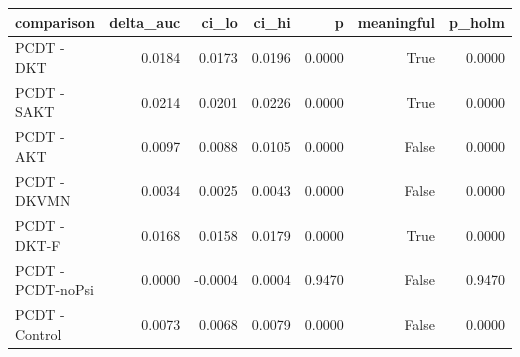 \begin{tabular}{lrrrrrr}
\toprule
comparison & delta\_auc & ci\_lo & ci\_hi & p & meaningful & p\_holm \\
\midrule
PCDT - DKT & 0.0184 & 0.0173 & 0.0196 & 0.0000 & True & 0.0000 \\
PCDT - SAKT & 0.0214 & 0.0201 & 0.0226 & 0.0000 & True & 0.0000 \\
PCDT - AKT & 0.0097 & 0.0088 & 0.0105 & 0.0000 & False & 0.0000 \\
PCDT - DKVMN & 0.0034 & 0.0025 & 0.0043 & 0.0000 & False & 0.0000 \\
PCDT - DKT-F & 0.0168 & 0.0158 & 0.0179 & 0.0000 & True & 0.0000 \\
PCDT - PCDT-noPsi & 0.0000 & -0.0004 & 0.0004 & 0.9470 & False & 0.9470 \\
PCDT - Control & 0.0073 & 0.0068 & 0.0079 & 0.0000 & False & 0.0000 \\
\bottomrule
\end{tabular}
